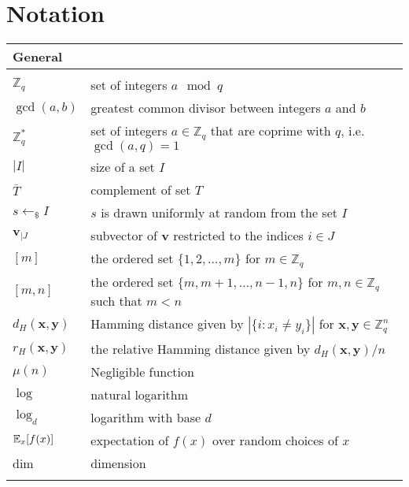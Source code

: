\chapter*{Notation}


\newcommand{\tabstart}[1]{\noindent \begin{tabular}{p{2.95cm}p{8.7cm}}
    \multicolumn{2}{l}{{\bf #1}} \\ \hline \\[-2.5ex] } 

\newcommand{\tabstop}{\\ \hline \end{tabular}}

\newcommand{\tabinter}{\vspace{1ex}}

\tabstart{General}
$\mathbb{Z}_q$ & set of integers $a \mod q$\\
$\gcd (a,b)$ & greatest common divisor between integers $a$ and $b$ \\
$\mathbb{Z}^*_q$ & set of integers $a\in\mathbb{Z}_q$ that are coprime with $q$, i.e. $\gcd (a,q) = 1$ \\
$|I|$ & size of a set $I$ \\
$\bar{T}$ & complement of set $T$ \\
$s\leftarrow_{\$}I$ & $s$ is drawn uniformly at random from the set $I$ \\
$\bm{v}_{|J}$ & subvector of $\bm{v}$ restricted to the indices $i \in J$ \\
$[m]$ & the ordered set $\{1, 2, \ldots, m\}$ for $m\in \mathbb{Z}_q$ \\
$[m, n]$ & the ordered set $\{m, m+1, \dots, n-1, n\}$ for $m, n\in \mathbb{Z}_q$ such that $m<n$ \\
$d_H(\bm{x}, \bm{y})$ & Hamming distance given by $ |\{ i : x_i \neq y_i \}|$ for $\bm{x},\bm{y}\in\mathbb{Z}^n_q$ \\
$r_H(\bm{x}, \bm{y})$ & the relative Hamming distance given by $d_H(\bm{x}, \bm{y})/n$ \\
$\mu(n)$ & Negligible function \\
  $\log$ & natural logarithm  \\
 $\log_d$ & logarithm with base $d$ \\
  $\operatorname*{\mathbb{E}}_{x}[f(x)]$ & expectation of $f(x)$ over random choices of $x$ \\
  dim & dimension \\
\tabstop

\tabinter

